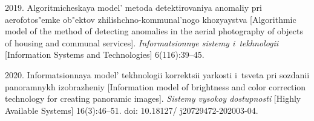 



  

\vspace*{-6pt}

  \begin{multicols}{2}

\renewcommand{\bibname}{\protect\rmfamily References}

{\small\frenchspacing
 {%
 \begin{thebibliography}{99}
 
  

 2019. Al\-go\-rit\-mi\-cheskaya mo\-del' me\-to\-da 
de\-tek\-ti\-ro\-va\-niya ano\-ma\-liy pri aero\-fo\-to\-s"em\-ke ob"\-ek\-tov  
zhi\-lishch\-no-kom\-mu\-nal'\-no\-go kho\-zyayst\-va [Algorithmic model of the method of 
detecting anomalies in the aerial photography of objects of housing and communal services]. 
\textit{In\-for\-ma\-tsi\-on\-nye sis\-te\-my i~tekh\-no\-lo\-gii} [Information Systems and Technologies] 
6(116):39--45.

 2020. In\-for\-ma\-tsi\-on\-naya mo\-del' 
 tekh\-no\-lo\-gii kor\-rek\-tsii yar\-kosti i~tsve\-ta pri so\-zda\-nii pa\-no\-ram\-nykh  
izo\-bra\-zhe\-niy [Information model of brightness and color correction technology for creating 
panoramic images]. \textit{Sis\-te\-my vy\-so\-koy do\-stup\-nosti} [Highly Available Systems]  
16(3):46--51. doi: 10.18127/ j20729472-202003-04.


\end{thebibliography}}}
\end{multicols}
